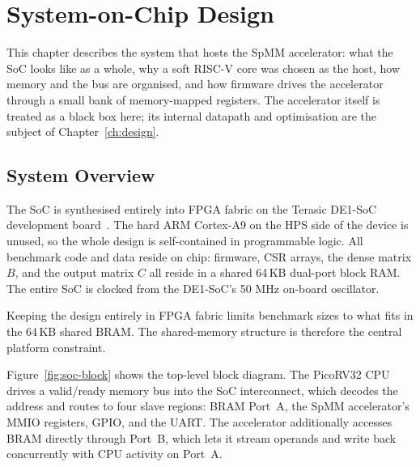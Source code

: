 \chapter{System-on-Chip Design}
\label{ch:platform}

This chapter describes the system that hosts the SpMM accelerator: what the
SoC looks like as a whole, why a soft RISC-V core was chosen as the host, how
memory and the bus are organised, and how firmware drives the accelerator
through a small bank of memory-mapped registers. The accelerator itself is
treated as a black box here; its internal datapath and optimisation are the
subject of Chapter~\ref{ch:design}.

\section{System Overview}

The SoC is synthesised entirely into FPGA fabric on the Terasic DE1-SoC
development board~\citep{de1soc_manual}. The hard ARM Cortex-A9 on the HPS side
of the device is unused, so the whole design is self-contained in
programmable logic. All benchmark code and data reside on chip: firmware,
CSR arrays, the dense matrix $B$, and the output matrix $C$ all reside in a
shared 64\,KB dual-port block RAM. The entire SoC is clocked from the DE1-SoC's
50 MHz on-board oscillator.

Keeping the design entirely in FPGA fabric limits benchmark
sizes to what fits in the 64\,KB shared BRAM. The shared-memory structure
is therefore the central platform constraint.

Figure~\ref{fig:soc-block} shows the top-level block diagram. The PicoRV32
CPU drives a valid/ready memory bus into the SoC interconnect, which decodes
the address and routes to four slave regions: BRAM Port~A, the SpMM
accelerator's MMIO registers, GPIO, and the UART. The accelerator
additionally accesses BRAM directly through Port~B, which lets it stream
operands and write back concurrently with CPU activity on Port~A.

